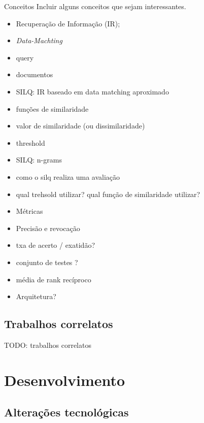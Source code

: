 \documentclass{beamer}
\begin{document}
\begin{frame}{Conceitos}
    Incluir alguns conceitos que sejam interessantes.
    \begin{itemize}
      \item Recuperação de Informação (IR);

      \item \textit{Data-Machting}
      \item query
      \item documentos
      \item SILQ: IR baseado em data matching aproximado
      \item funções de similaridade
      \item valor de similaridade (ou dissimilaridade)
      \item threshold
      \item SILQ: n-grams
      \item como o silq realiza uma avaliação

      \item qual trehsold utilizar? qual função de similaridade utilizar?
      \item Métricas
      \item Precisão e revocação
      \item txa de acerto / exatidão?
      \item conjunto de testes ?
      \item média de rank recíproco

      \item Arquitetura?
    \end{itemize}
\end{frame}

\subsection{Trabalhos correlatos}

\begin{frame}
  TODO: trabalhos correlatos
\end{frame}

\section{Desenvolvimento}


\subsection{Alterações tecnológicas}
\end{document}
